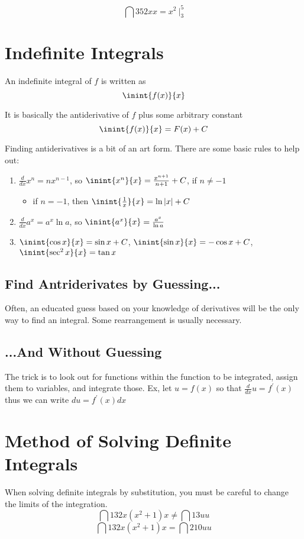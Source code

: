 \documentclass[12pt]{article}
\begin{document}
\[ \dint{3}{5}{2x}{x} = x^2\ \bigg|_3^5 \]

\section*{Indefinite Integrals}
An indefinite integral of $f$ is written as \[ \inint{f(x)}{x} \]

It is basically the antiderivative of $f$ plus some arbitrary constant \[ \inint{f(x)}{x} = F(x) +C \]

Finding antiderivatives is a bit of an art form. There are some basic rules to help out:
\begin{enumerate}
\item $\frac{d}{dx}x^n = nx^{n-1}$, so $\inint{x^n}{x} = \frac{x^{n+1}}{n+1} + C$, if $n\neq -1$
\begin{itemize}
\item if $n=-1$, then $\inint{\frac{1}{x}}{x} = \ln{|x|} + C$
\end{itemize}
\item $\frac{d}{dx}a^x = a^x\ln{a}$, so $\inint{a^x}{x} = \frac{a^x}{\ln{a}}$
\item $\inint{\cos x}{x} = \sin x + C$, $\inint{\sin x}{x} = -\cos x + C$, $\inint{\sec^2 x}{x} = \tan x$
\end{enumerate}

\subsection*{Find Antriderivates by Guessing...}
Often, an educated guess based on your knowledge of derivatives will be the only way to find an integral. Some rearrangement is usually necessary.

\subsection*{...And Without Guessing}
The trick is to look out for functions within the function to be integrated, assign them to variables, and integrate those. Ex, let $u = f(x)$ so that $\frac{d}{dx}u = f^\prime(x)$ thus we can write $du = f^\prime(x)dx$

\section*{Method of Solving Definite Integrals}
When solving definite integrals by substitution, you must be careful to change the limits of the integration. \[ \dint{1}{3}{2x(x^2+1)}{x} \neq \dint{1}{3}{u}{u} \] \[ \dint{1}{3}{2x(x^2+1)}{x} = \dint{2}{10}{u}{u} \]
\end{document}
